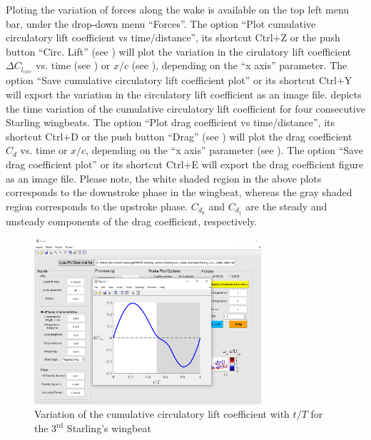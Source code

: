 \documentclass[12pt,a4paper]{article}
\begin{document}
Ploting the variation of forces along the wake is available on the top left menu bar, under the drop-down menu ``Forces''. 
The option ``Plot cumulative circulatory lift coefficient vs time/distance'', its shortcut Ctrl+Z or the push button ``Circ. Lift'' (see ) will plot the variation in the cirulatory lift coefficient $\Delta C_{l_{circ}}$ vs. time (see ) or $x/c$ (see ), depending on the ``x axis'' parameter. The option ``Save cumulative circulatory lift coefficient plot'' or its shortcut Ctrl+Y will export the variation in the circulatory lift coefficient as an image file.
 depicts the time variation of the cumulative circulatory lift coefficient for four consecutive Starling wingbeats.
The option ``Plot drag coefficient vs time/distance'', its shortcut Ctrl+D  or the push button ``Drag'' (see ) will plot the drag coefficient $C_d$ vs. time or $x/c$, depending on the ``x axis'' parameter (see ). The option ``Save drag coefficient plot'' or its shortcut Ctrl+E will export the drag coefficient figure as an image file.
Please note, the white shaded region in the above plots corresponds to the downstroke phase in the wingbeat, whereas the gray shaded region corresponds to the upstroke phase. $C_{d_0}$ and $C_{d_1}$ are the steady and unsteady components of the drag coefficient, respectively.

\newpage
\begin{figure}[ht!]
	\centering
	\includegraphics[width=0.75\textwidth]{dCl-plot}
	\caption{Variation of the cumulative circulatory lift coefficient with $t/T$ for the $3^\mathrm{rd}$ Starling's wingbeat}
	\label{fig:GUI-dCl-plot}
\end{figure}
\end{document}
